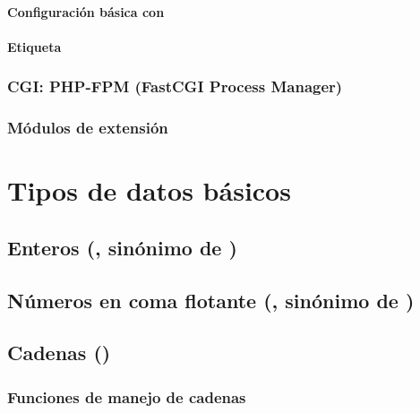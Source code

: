\documentclass[a4paper,11pt,spanish]{sphinxmanual}
\begin{document}
\paragraph{Configuración básica con }
\label{\detokenize{php:configuracion-basica-con-php-ini}}

\paragraph{Etiqueta }
\label{\detokenize{php:etiqueta}}

\subsubsection{CGI: PHP-FPM (FastCGI Process Manager)}
\label{\detokenize{php:cgi-php-fpm-fastcgi-process-manager}}

\subsubsection{Módulos de extensión}
\label{\detokenize{php:modulos-de-extension}}

\section{Tipos de datos básicos}
\label{\detokenize{php:tipos-de-datos-basicos}}

\subsection{Enteros (, sinónimo de )}
\label{\detokenize{php:enteros-int-sinonimo-de-integer}}

\subsection{Números en coma flotante (, sinónimo de )}
\label{\detokenize{php:numeros-en-coma-flotante-float-sinonimo-de-double}}

\subsection{Cadenas ()}
\label{\detokenize{php:cadenas-string}}

\subsubsection{Funciones de manejo de cadenas}
\label{\detokenize{php:funciones-de-manejo-de-cadenas}}
\end{document}
